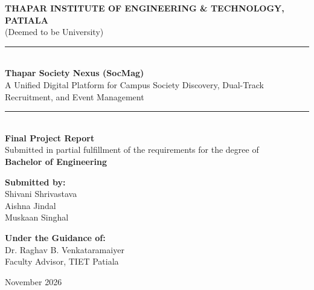 \documentclass[12pt,a4paper]{report}
\begin{document}
\begin{titlepage}
    \centering
    \vspace*{0.8cm}
    {\Large \textbf{THAPAR INSTITUTE OF ENGINEERING \& TECHNOLOGY, PATIALA}}\\[0.3cm]
    {\large (Deemed to be University)}\\[1.4cm]

    \rule{\linewidth}{0.5mm}\\[0.5cm]
    {\Huge \textbf{\color{tietblue}Thapar Society Nexus (SocMag)}}\\[0.35cm]
    {\Large A Unified Digital Platform for Campus Society Discovery, Dual-Track Recruitment, and Event Management}\\[0.3cm]
    \rule{\linewidth}{0.5mm}\\[1.6cm]

    {\large \textbf{Final Project Report}}\\[0.35cm]
    {\normalsize Submitted in partial fulfillment of the requirements for the degree of}\\[0.2cm]
    {\normalsize \textbf{Bachelor of Engineering}}\\[1.8cm]

    \begin{minipage}{0.48\textwidth}
        \begin{flushleft}
            \textbf{Submitted by:}\\
            Shivani Shrivastava\\
            Aishna Jindal\\
            Muskaan Singhal
        \end{flushleft}
    \end{minipage}
    \hfill
    \begin{minipage}{0.48\textwidth}
        \begin{flushright}
            \textbf{Under the Guidance of:}\\
            Dr. Raghav B. Venkataramaiyer\\
            Faculty Advisor, TIET Patiala
        \end{flushright}
    \end{minipage}

    \vfill
    {\large November 2026}
\end{titlepage}

\end{document}
